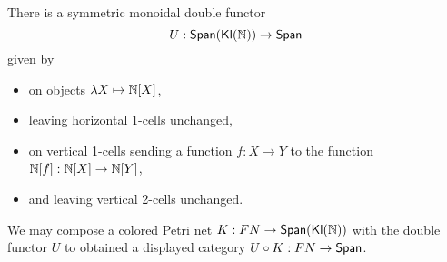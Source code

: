 \begin{prop}
    There is a symmetric monoidal double functor 
    \[ U : \mathsf{Span}(\mathsf{\mathsf{Kl}(\mathbb{N}) }) \to \mathsf{Span}\]
    given by 
    \begin{itemize}
        \item  on objects $ \lambda X \mapsto \mathbb{N}[X]$,
        \item leaving horizontal 1-cells unchanged,
        \item on vertical 1-cells sending a function $f: X \to Y$ to the function $\mathbb{N}[f] : \mathbb{N}[X] \to \mathbb{N}[Y]$,
        \item and leaving vertical 2-cells unchanged.
    \end{itemize}
\end{prop}
We may compose a colored Petri net $K : FN 
\to \mathsf{Span}(\mathsf{\mathsf{Kl}(\mathbb{N}) })$ with the double functor $U$ to obtained a displayed category $U \circ K : FN \to \mathsf{Span}$.




